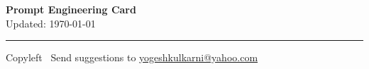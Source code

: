 % 




\begin{center}
     \Large{\textbf{Prompt Engineering Card}}  \\ \small Updated: \today 
\end{center}

\raggedright
\small
\begin{multicols}{3}





\vspace{2mm}

\rule{0.3\linewidth}{0.25pt}

\scriptsize
Copyleft \textcopyleft\  Send suggestions to 
\href{http://www.yogeshkulkarni.com}{yogeshkulkarni@yahoo.com}

\end{multicols}


